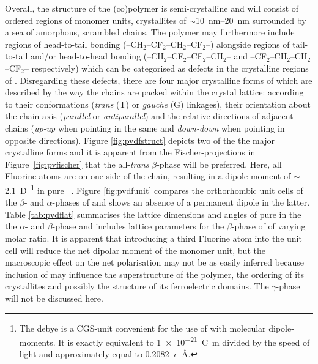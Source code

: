 Overall, the structure of the (co)polymer is semi-crystalline and will consist of ordered regions of monomer units, crystallites of $\sim$\SIrange{10}{20}{\nano\metre} surrounded by a sea of amorphous, scrambled chains. The polymer may furthermore include regions of head-to-tail bonding (--CH$_2$--CF$_2$--CH$_2$--CF$_2$--) alongside regions of tail-to-tail and/or head-to-head bonding (--CH$_2$--CF$_2$--CF$_2$--CH$_2$-- and --CF$_2$--CH$_2$--CH$_2$--CF$_2$-- respectively) which can be categorised as defects in the crystalline regions of \pvdf{}. Disregarding these defects, there are four major crystalline forms of \pvdf{} which are described by the way the chains are packed within the crystal lattice: according to their conformations (\emph{trans} (T) or \emph{gauche} (G) linkages), their orientation about the chain axis (\emph{parallel} or \emph{antiparallel}) and the relative directions of adjacent chains (\emph{up-up} when pointing in the same and \emph{down-down} when pointing in opposite directions). Figure \ref{fig:pvdfstruct} depicts two of the the major crystalline forms and it is apparent from the Fischer-projections in Figure~\ref{fig:pvfischer} that the all-\emph{trans} $\beta$-phase will be preferred. Here, all Fluorine atoms are on one side of the chain, resulting in a dipole-moment of $\sim$\SI{2.1}{D}~\footnote{The debye is a CGS-unit convenient for the use of with molecular dipole-moments. It is exactly equivalent to \SI{1e-21}{\coulomb\metre} divided by the speed of light and  approximately equal to \SI{0.2082}{\elementarycharge\angstrom}.} in pure \pvdf{}~\cite[pp. 810]{encyclopedia}. Figure \ref{fig:pvdfunit} compares the orthorhombic unit cells of the $\beta$- and $\alpha$-phases of \pvdf{} and shows an absence of a permanent dipole in the latter. Table \ref{tab:pvdflat} summarises the lattice dimensions and angles of pure \pvdf{} in the the $\alpha$- and $\beta$-phase and includes lattice parameters for the $\beta$-phase of \pvfe{} of varying molar ratio. It is apparent that introducing a third Fluorine atom into the unit cell will reduce the net dipolar moment of the monomer unit, but the macroscopic effect on the net polarisation may not be as easily inferred because inclusion of \trfe{} may influence the superstructure of the polymer, the ordering of its crystallites and possibly the structure of its ferroelectric domains. The $\gamma$-phase will not be discussed here.
